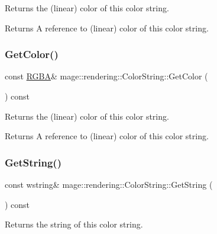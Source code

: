 Returns the (linear) color of this color string.

\begin{DoxyReturn}{Returns}
A reference to (linear) color of this color string. 
\end{DoxyReturn}
\mbox{\label{classmage_1_1rendering_1_1_color_string_a08bd67511180f15e902ce34dd402fe82}} 
\subsubsection{\texorpdfstring{Get\+Color()}{GetColor()}\hspace{0.1cm}{\footnotesize\ttfamily [2/2]}}
{\footnotesize\ttfamily const \mbox{\hyperlink{structmage_1_1_r_g_b_a}{R\+G\+BA}}\& mage\+::rendering\+::\+Color\+String\+::\+Get\+Color (\begin{DoxyParamCaption}{ }\end{DoxyParamCaption}) const\hspace{0.3cm}{\ttfamily [noexcept]}}

Returns the (linear) color of this color string.

\begin{DoxyReturn}{Returns}
A reference to (linear) color of this color string. 
\end{DoxyReturn}
\mbox{\label{classmage_1_1rendering_1_1_color_string_a146cf063553b65b3cd854417b638b533}} 
\subsubsection{\texorpdfstring{Get\+String()}{GetString()}}
{\footnotesize\ttfamily const wstring\& mage\+::rendering\+::\+Color\+String\+::\+Get\+String (\begin{DoxyParamCaption}{ }\end{DoxyParamCaption}) const\hspace{0.3cm}{\ttfamily [noexcept]}}

Returns the string of this color string.

